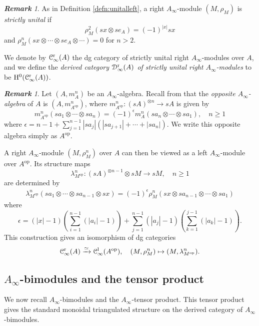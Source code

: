 \documentclass[a4paper, 11pt]{amsart}
\theoremstyle{definition}
\theoremstyle{remark}
\newtheorem{rem}[thm]{\bf Remark}
\numberwithin{equation}{section}
\newcommand{\LL}{\mathrm{l}}
\newcommand{\RR}{\mathrm{r}}
\newcommand{\op}{\mathrm{op}}
\newcommand{\EC}{\EuScript{C}}
\newcommand{\ED}{\EuScript{D}}
\begin{document}
\begin{rem}\label{rem:unitalright}
 As in Definition \ref{defn:unitalleft}, a right $A_\infty$-module $(M,\rho_M)$ is {\it strictly unital} if
\[
\rho_M^2(sx\otimes se_A)=(-1)^{|x|}sx
\]
and $\rho_M^n(sx\otimes\dotsb\otimes se_A\otimes\dotsb)=0$ for $n>2$.
\end{rem}


We denote by $\EC^{\RR}_\infty(A)$ the dg category of strictly unital right $A_\infty$-modules over $A$, and we define the {\it derived category $\ED^{\RR}_{\infty}(A)$ of strictly unital right $A_\infty$-modules} to be $\mathrm H^0(\EC^{\RR}_\infty(A))$.


\begin{rem}
Let $(A,m_A^n)$ be an $A_\infty$-algebra. Recall from \cite[Remark 5.8]{CLW} that the {\it opposite $A_\infty$-algebra} of $A$ is $(A,m^n_{A^{\op}})$, where $m^n_{A^{\op}}\colon (sA)^{\otimes n}\to sA$ is given by
\[
m^n_{A^{\op}}(sa_1\otimes \dotsb \otimes sa_n) = (-1)^{\epsilon} m^n_A(sa_n \otimes \dotsb \otimes sa_1) , \quad n \geq 1
\]
where $\epsilon=n-1+\sum_{j=1}^{n-1}|sa_j|(|sa_{j+1}|+\dotsb+|sa_n|)$. We write this opposite algebra simply as $A^{\op}$.

A right $A_\infty$-module $(M,\rho_M^n)$ over $A$ can then be viewed as a left $A_\infty$-module over $A^{\op}$. Its structure maps
\[
\lambda^n_{M^{\op}} \colon (sA)^{\otimes n-1} \otimes sM \to sM,\quad n\geq 1
\]
are determined by
\begin{align*}
 \lambda^n_{M^{\op}}(sa_1\otimes \dotsb \otimes sa_{n-1} \otimes sx) = (-1)^{\epsilon}
 {\rho}_M^n(sx \otimes sa_{n-1} \otimes \dotsb \otimes sa_1)
\end{align*}
where
\[
\epsilon=(|x|-1)\left(\sum^{n-1}_{i=1}(|a_i|-1)\right)+\sum^{n-1}_{j=1}(|a_j|-1)\left(\sum^{j-1}_{k=1}(|a_k|-1)\right).
\]
This construction gives an isomorphism of dg categories
\begin{align}\label{align:leftrightopposite}
 \EC^{\RR}_\infty(A) \xrightarrow{\simeq} \EC^{\LL}_\infty(A^{\op}), \quad (M, \rho_M^n) \mapsto (M, \lambda_{M^{\op}}^n).
\end{align}
\end{rem}


\subsection{\texorpdfstring{$A_{\infty}$}{}-bimodules and the tensor product}
We now recall $A_\infty$-bimodules and the $A_\infty$-tensor product. This tensor product gives the standard monoidal triangulated structure on the derived category of $A_\infty$-bimodules.
\end{document}
